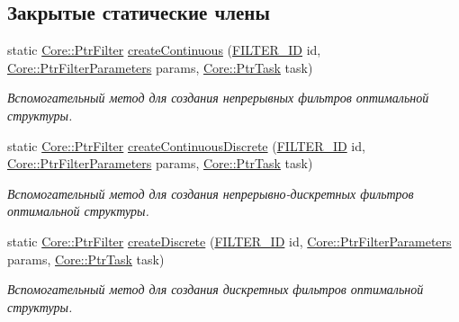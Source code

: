 \subsection*{Закрытые статические члены}
\begin{DoxyCompactItemize}
\item 
static \hyperlink{namespace_core_afba80c2cb714c7d5793d9bcb9591e156}{Core\+::\+Ptr\+Filter} \hyperlink{class_filters_1_1_filter_factory_a0c5ef077dc893e280e0fe63a42d7d84f}{create\+Continuous} (\hyperlink{namespace_filters_a1b615faac44ef992d0af44da40ff26d7}{F\+I\+L\+T\+E\+R\+\_\+\+ID} id, \hyperlink{namespace_core_a4811af8148ba137d644b9a61a042cf03}{Core\+::\+Ptr\+Filter\+Parameters} params, \hyperlink{namespace_core_abfda8f69fcacfcea2696549b548ed737}{Core\+::\+Ptr\+Task} task)\hypertarget{class_filters_1_1_filter_factory_a0c5ef077dc893e280e0fe63a42d7d84f}{}\label{class_filters_1_1_filter_factory_a0c5ef077dc893e280e0fe63a42d7d84f}

\begin{DoxyCompactList}\small\item\em Вспомогательный метод для создания непрерывных фильтров оптимальной структуры. \end{DoxyCompactList}\item 
static \hyperlink{namespace_core_afba80c2cb714c7d5793d9bcb9591e156}{Core\+::\+Ptr\+Filter} \hyperlink{class_filters_1_1_filter_factory_a0db9538bb9f4cf762c382a9a264d67d9}{create\+Continuous\+Discrete} (\hyperlink{namespace_filters_a1b615faac44ef992d0af44da40ff26d7}{F\+I\+L\+T\+E\+R\+\_\+\+ID} id, \hyperlink{namespace_core_a4811af8148ba137d644b9a61a042cf03}{Core\+::\+Ptr\+Filter\+Parameters} params, \hyperlink{namespace_core_abfda8f69fcacfcea2696549b548ed737}{Core\+::\+Ptr\+Task} task)\hypertarget{class_filters_1_1_filter_factory_a0db9538bb9f4cf762c382a9a264d67d9}{}\label{class_filters_1_1_filter_factory_a0db9538bb9f4cf762c382a9a264d67d9}

\begin{DoxyCompactList}\small\item\em Вспомогательный метод для создания непрерывно-\/дискретных фильтров оптимальной структуры. \end{DoxyCompactList}\item 
static \hyperlink{namespace_core_afba80c2cb714c7d5793d9bcb9591e156}{Core\+::\+Ptr\+Filter} \hyperlink{class_filters_1_1_filter_factory_a2afeb17c3cb614d3319feac10ccdcfa9}{create\+Discrete} (\hyperlink{namespace_filters_a1b615faac44ef992d0af44da40ff26d7}{F\+I\+L\+T\+E\+R\+\_\+\+ID} id, \hyperlink{namespace_core_a4811af8148ba137d644b9a61a042cf03}{Core\+::\+Ptr\+Filter\+Parameters} params, \hyperlink{namespace_core_abfda8f69fcacfcea2696549b548ed737}{Core\+::\+Ptr\+Task} task)\hypertarget{class_filters_1_1_filter_factory_a2afeb17c3cb614d3319feac10ccdcfa9}{}\label{class_filters_1_1_filter_factory_a2afeb17c3cb614d3319feac10ccdcfa9}

\begin{DoxyCompactList}\small\item\em Вспомогательный метод для создания дискретных фильтров оптимальной структуры. \end{DoxyCompactList}\end{DoxyCompactItemize}


